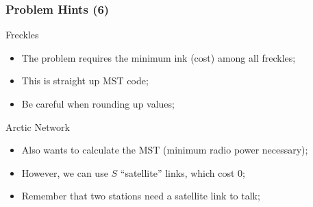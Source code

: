 \begin{frame}
  \frametitle{Problem Hints (6)}
  \begin{block}{Freckles}
    \begin{itemize}
    \item The problem requires the minimum ink (cost) among all freckles;
    \item This is straight up MST code;
    \item Be careful when rounding up values;
    \end{itemize}    
  \end{block}
  \begin{block}{Arctic Network}
    \begin{itemize}
    \item Also wants to calculate the MST (minimum radio power necessary);
    \item However, we can use $S$ ``satellite'' links, which cost 0;
    \item Remember that two stations need a satellite link to talk;
    \end{itemize}
  \end{block}
\end{frame}

